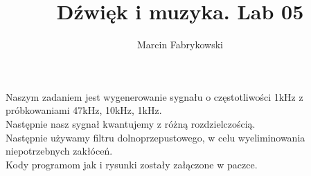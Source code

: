 \documentclass[a4paper,12pt]{article}
\author{Marcin Fabrykowski}
\title{Dźwięk i muzyka. Lab 05}
\begin{document}
\maketitle
\newpage
Naszym zadaniem jest wygenerowanie sygnału o częstotliwości 1kHz z próbkowaniami 47kHz, 10kHz, 1kHz.\\
Następnie nasz sygnał kwantujemy z różną rozdzielczością.\\
Następnie używamy filtru dolnoprzepustowego, w celu wyeliminowania niepotrzebnych zakłóceń.\\
Kody programom jak i rysunki zostały załączone w paczce.
\end{document}
